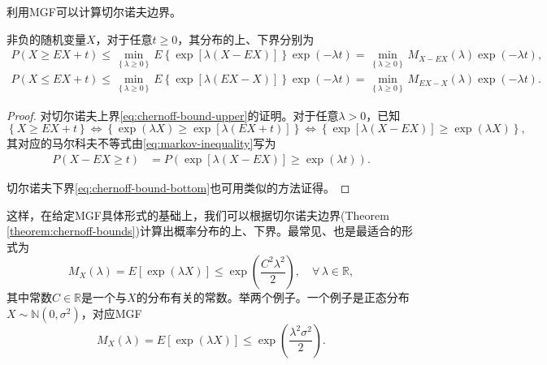 利用MGF可以计算切尔诺夫边界。
\begin{theorem}[切尔诺夫边界]
  \label{theorem:chernoff-bounds}
  非负的随机变量$X$，对于任意$t \ge 0$，其分布的上、下界分别为
  \begin{align}
    \label{eq:chernoff-bound-upper}
    P \left( X \ge E X + t \right) \le \min_{ \left\{ \lambda \ge 0 \right\}}
    E \left\{ \exp \left[ \lambda \left( X - E X \right)\right]\right\} \exp \left( - \lambda t \right)
    = \min_{\left\{ \lambda \ge 0 \right\}}
    M_{X - E X} \left( \lambda \right) \exp \left( - \lambda t \right)
    , \\
    \label{eq:chernoff-bound-bottom}
    P \left( X \le E X + t \right) \le \min_{ \left\{ \lambda \ge 0 \right\}}
    E \left\{ \exp \left[ \lambda \left( E X - X \right)\right]\right\} \exp \left( - \lambda t \right)
    = \min_{\left\{ \lambda \ge 0 \right\}}
    M_{E X - X} \left( \lambda \right) \exp \left( - \lambda t \right).
  \end{align}
\end{theorem}
\begin{proof}
  对切尔诺夫上界\eqref{eq:chernoff-bound-upper}的证明。对于任意$\lambda > 0$，已知
  \begin{equation*}
    \left\{ X \ge E X + t \right\}
    \Longleftrightarrow
    \left\{
    \exp \left( \lambda X \right) \ge \exp \left[ \lambda \left( E X + t \right) \right]
    \right\}
    \Longleftrightarrow
    \left\{
    \exp \left[ \lambda \left( X - E X \right) \right]
    \ge \exp \left( \lambda X \right)
    \right\},
  \end{equation*}
  其对应的马尔科夫不等式由\eqref{eq:markov-inequality}写为
  \begin{equation*}
    \begin{split}
      P \left(
      X - E X \ge t
      \right)
      & = P \left(
      \exp \left[ \lambda \left( X - E X \right) \right]
      \ge
      \exp \left( \lambda t \right)\right).
    \end{split}
  \end{equation*}

切尔诺夫下界\eqref{eq:chernoff-bound-bottom}也可用类似的方法证得。
\end{proof}

这样，在给定MGF具体形式的基础上，我们可以根据切尔诺夫边界(Theorem \ref{theorem:chernoff-bounds})计算出概率分布的上、下界。最常见、也是最适合的形式为
\begin{equation}
  \label{eq:lln-slln-mgf-explicit}
  M_{X} \left( \lambda \right) = E \left[ \exp \left( \lambda X \right) \right]
  \le \exp \left( \frac{C^{2} \lambda^{2}}{2} \right), \quad \forall \, \lambda \in \mathbb{R},
\end{equation}
其中常数$C \in \mathbb{R}$是一个与$X$的分布有关的常数。举两个例子。一个例子是正态分布$X \sim \mathbb{N} \left( 0, \sigma^{2} \right)$，对应MGF
\begin{equation*}
  M_{X} \left( \lambda \right)
  = E \left[ \exp \left( \lambda X \right)\right] \le \exp \left( \frac{\lambda^{2} \sigma^{2}}{2}\right).
\end{equation*}

